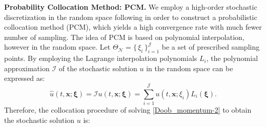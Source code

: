 \vspace{0.1 in}
\textbf{Probability Collocation Method: PCM.}
We employ a high-order stochastic discretization in the random space following \cite{xiu2005, Foo08} in order to construct a probabilistic collocation method (PCM), which yields a high convergence rate with much fewer number of sampling. The idea of PCM is based on polynomial interpolation, however in the random space. Let $\Theta_\mathcal{N} = \big\{ \, \xi_i \, \big\}_{i=1}^{\mathcal{J}}$ be a set of prescribed sampling points. By employing the Lagrange interpolation polynomials $L_i$, the polynomial approximation $\mathcal{I}$ of
the stochastic solution $u$ in the random space can be expressed as: 
%
\begin{equation}
\label{Eq: Lagrange Int}
%
\hat{u}(t,\textbf{x}; \boldsymbol \xi)  =
\mathcal{I}u(t,\textbf{x}; \boldsymbol \xi) 
= \sum_{i=1}^{\mathcal{J}} u(t,\textbf{x}; \xi_i)L_i(\boldsymbol{\xi}).
%
\end{equation}
%
Therefore, the collocation procedure of solving \eqref{Doob_momentum-2} to obtain the stochastic solution $u$ is:

